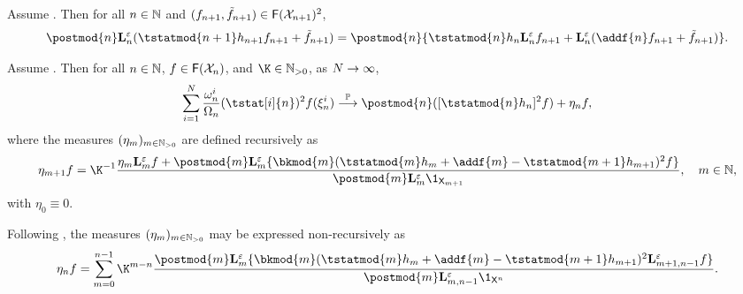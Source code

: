\begin{lemma} \label{eq:critical:identity}
Assume . Then for all $n \in \mathbb{N}$ and $(f_{n + 1}, \tilde{f}_{n + 1}) \in \mathsf{F}(\mathcal{X}_{n + 1})^2$, 
$$
\postmod{n} \ukmod{n}(\tstatmod{n + 1} h_{n + 1} f_{n + 1} + \ftd{n + 1}) = \postmod{n}\{\tstatmod{n} h_n \ukmod{n} f_{n + 1} + \ukmod{n} (\addf{n} f_{n + 1} + \ftd{n + 1})\}. 
$$
\end{lemma}

\begin{lemma}
\label{lem:hoeffding:tau:square}
Assume . Then for all $n \in \mathbb{N}$, $f \in \mathsf{F}(\mathcal{X}_n)$, and $\K \in \nsetpos$, as $N \to \infty$, 
\[
\sum_{i = 1}^\N \frac{\ewght{n}{i}}{\sumwght{n}}(\tstat[i]{n})^2 f(\epart{n}{i}) \pplim \postmod{n}([\tstatmod{n} h_n]^2 f) + \eta_n f, 
\]
where the measures $(\eta_m)_{m \in \mathbb{N}_{> 0}}$ are defined recursively as 
\[
\eta_{m + 1} f = \K^{-1} \frac{\eta_m \ukmod{m} f +  \postmod{m} \ukmod{m} \{ \bkmod{m}(\tstatmod{m} h_m + \addf{m} - \tstatmod{m + 1} h_{m + 1})^2 f \}}{\postmod{m} \ukmod{m} \1_{\Xset_{m + 1}}}, \quad m \in \nset, 
\]
with $\eta_0 \equiv 0$. 
\end{lemma}

Following \cite[Lemma~13]{olsson:westerborn:2017}, the measures $(\eta_m)_{m \in \mathbb{N}_{> 0}}$ may be expressed non-recursively as
\begin{equation}
\label{eq:def:etak}
\eta_n f = \sum_{m = 0}^{n - 1} \K^{m - n} \frac{\postmod{m} \ukmod{m} \{ \bkmod{m}(\tstatmod{m} h_m + \addf{m} - \tstatmod{m + 1} h_{m + 1})^2 \ukmod{m + 1, n - 1} f \}}{\postmod{m} \ukmod{m, n - 1} \1_{\Xset^n}}.
\end{equation}

